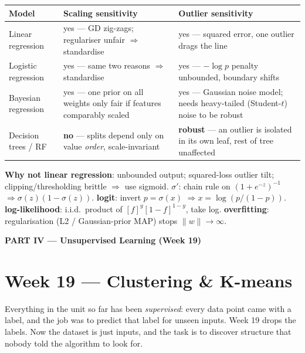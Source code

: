 \documentclass[11pt, a4paper]{article}
\newcommand{\thead}[1]{\textbf{#1}}
\newcommand{\kw}[1]{\textbf{#1}}
\begin{document}
\begin{center}
\renewcommand{\arraystretch}{1.25}
\begin{tabularx}{\linewidth}{l X X}
\toprule
\thead{Model} & \thead{Scaling sensitivity} & \thead{Outlier sensitivity} \\
\midrule
Linear regression & yes — GD zig-zags; regulariser unfair $\Rightarrow$ standardise &
yes — squared error, one outlier drags the line \\
Logistic regression & yes — same two reasons $\Rightarrow$ standardise &
yes — $-\log p$ penalty unbounded, boundary shifts \\
Bayesian regression & yes — one prior on all weights only fair if features comparably scaled &
yes — Gaussian noise model; needs heavy-tailed (Student-$t$) noise to be robust \\
Decision trees / RF & \kw{no} — splits depend only on value \emph{order}, scale-invariant &
\kw{robust} — an outlier is isolated in its own leaf, rest of tree unaffected \\
\bottomrule
\end{tabularx}
\end{center}

\begin{exambox}
\textbf{Why not linear regression}: unbounded output; squared-loss outlier tilt; clipping/thresholding
brittle $\Rightarrow$ use sigmoid. \quad
\textbf{$\sigma'$}: chain rule on $(1+e^{-z})^{-1}$ $\Rightarrow\sigma(z)(1-\sigma(z))$. \quad
\textbf{logit}: invert $p=\sigma(x)$ $\Rightarrow x=\log(p/(1-p))$. \quad
\textbf{log-likelihood}: i.i.d.\ product of $[f]^y[1-f]^{1-y}$, take log. \quad
\textbf{overfitting}: regularisation (L2 / Gaussian-prior MAP) stops $\|w\|\to\infty$.
\end{exambox}

\begin{center}\large\bfseries\color{defBd} PART IV — Unsupervised Learning (Week 19)\end{center}

\section{Week 19 — Clustering \& K-means}

Everything in the unit so far has been \emph{supervised}: every data point came with a label, and
the job was to predict that label for unseen inputs. Week 19 drops the labels. Now the dataset is
just inputs, and the task is to discover structure that nobody told the algorithm to look for.
\end{document}
